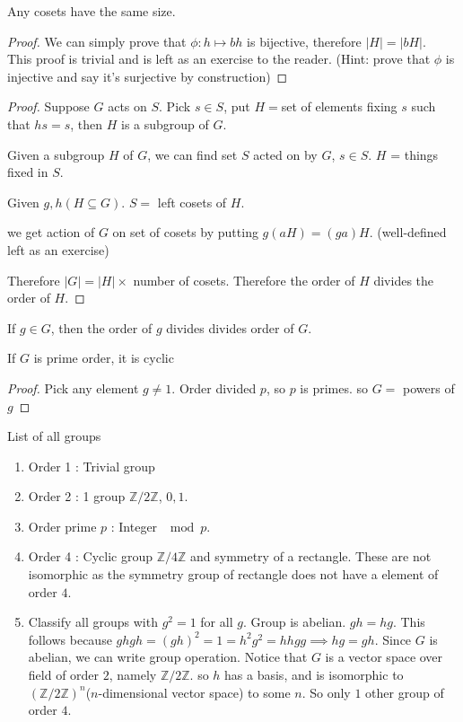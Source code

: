 \documentclass[12pt,letterpaper]{article}
\renewcommand{\b}{\mathbb}
\begin{document}
\begin{lemma}
	Any cosets have the same size.
\end{lemma}
\begin{proof}
    We can simply prove that $\phi: h \mapsto bh$ is bijective, therefore $|H| = |bH|$. \\
    This proof is trivial and is left as an exercise to the reader. (Hint: prove that $\phi$ is injective and say it's surjective by construction)
\end{proof}
\begin{proof}
	Suppose $G$ acts on $S$. Pick $s \in S$, put $H = $set of elements fixing $s$ such that $hs = s$, then $H$ is a subgroup of $G$.

	Given a subgroup $H$ of $G$, we can find set $S$ acted on by $G$, $s \in S$. $H$ = things fixed in $S$.

	Given $g,h (H \subseteq G)$. $S = $ left cosets of $H$. 

	we get action of $G$ on set of cosets by putting $g(aH) = (ga)H$. (well-defined left as an exercise)

	Therefore $|G| = |H| \times $ number of cosets. Therefore the order of $H$ divides the order of $H$.
\end{proof}
\begin{theorem}
	If $g \in G$, then the order of $g$ divides divides order of $G$.
\end{theorem}
\begin{corollary}
	If $G$ is prime order, it is cyclic
\end{corollary}
\begin{proof}
	Pick any element $g \neq 1$. Order divided $p$, so $p$ is primes. so $G = $ powers of $g$
\end{proof}
\begin{example}
	List of all groups
	\begin{enumerate}
		\item Order 1 : Trivial group
		\item Order 2 : 1 group $\b Z/2\b Z$, $0,1$.
		\item Order prime $p$ : Integer $\mod p$.
		\item Order 4 : Cyclic group $\b Z/4 \b Z$ and symmetry of a rectangle. These are not isomorphic as the symmetry group of rectangle does not have a element of order $4$. 

		\item Classify all groups with $g^2 = 1$ for all $g$. Group is abelian. $gh = hg$. This follows because $ghgh = (gh)^2 = 1 = h^2g^2 = hhgg \implies hg = gh$.
		 Since $G$ is abelian, we can write group operation. Notice that $G$ is a vector space over field of order $2$, namely $\b Z/2 \b Z$. so $h$ has a basis, and is isomorphic to $\left( \b Z/2\b Z\right)^n$($n$-dimensional vector space) to some $n$. So only $1$ other group of order $4$.
	\end{enumerate}
\end{example}
\end{document}
